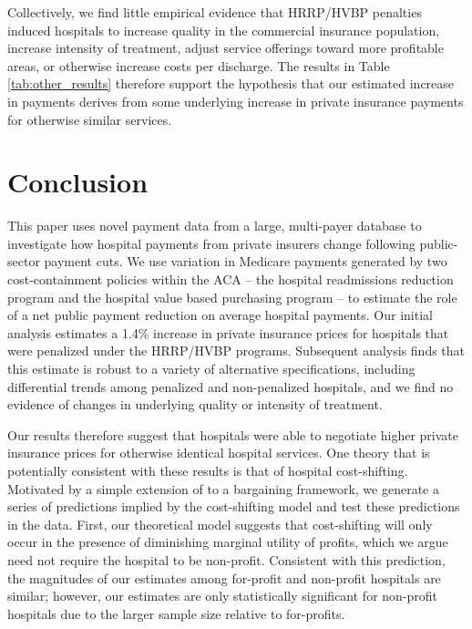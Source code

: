 \documentclass[12pt]{article}
\begin{document}
Collectively, we find little empirical evidence that HRRP/HVBP penalties induced hospitals to increase quality in the commercial insurance population, increase intensity of treatment, adjust service offerings toward more profitable areas, or otherwise increase costs per discharge. The results in Table \ref{tab:other_results} therefore support the hypothesis that our estimated increase in payments derives from some underlying increase in private insurance payments for otherwise similar services.


\section{Conclusion}
\label{sec:Conclusion}
This paper uses novel payment data from a large, multi-payer database to investigate how hospital payments from private insurers change following public-sector payment cuts. We use variation in Medicare payments generated by two cost-containment policies within the ACA -- the hospital readmissions reduction program and the hospital value based purchasing program -- to estimate the role of a net public payment reduction on average hospital payments. Our initial analysis estimates a 1.4\% increase in private insurance prices for hospitals that were penalized under the HRRP/HVBP programs. Subsequent analysis finds that this estimate is robust to a variety of alternative specifications, including differential trends among penalized and non-penalized hospitals, and we find no evidence of changes in underlying quality or intensity of treatment.

Our results therefore suggest that hospitals were able to negotiate higher private insurance prices for otherwise identical hospital services. One theory that is potentially consistent with these results is that of hospital cost-shifting. Motivated by a simple extension of \cite{dranove1988} to a bargaining framework, we generate a series of predictions implied by the cost-shifting model and test these predictions in the data. First, our theoretical model suggests that cost-shifting will only occur in the presence of diminishing marginal utility of profits, which we argue need not require the hospital to be non-profit. Consistent with this prediction, the magnitudes of our estimates among for-profit and non-profit hospitals are similar; however, our estimates are only statistically significant for non-profit hospitals due to the larger sample size relative to for-profits.
\end{document}
